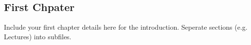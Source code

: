 \documentclass[../notes.tex]{subfile}
\begin{document}
\begin{refsection}
\chapter[First Chpater]{First Chpater}\label{chap:First Chpater}

Include your first chapter details  here for the introduction. Seperate sections (e.g. Lectures) into subfiles. 



\end{refsection}
\end{document}
